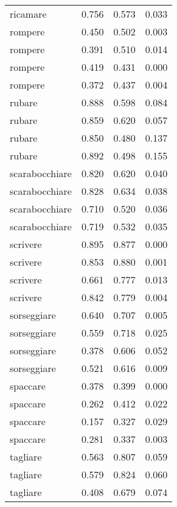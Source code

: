 \begin{longtable}{l|rrr}
ricamare       & 0.756  & 0.573     & 0.033         \\
rompere        & 0.450   & 0.502     & 0.003         \\
rompere        & 0.391  & 0.510      & 0.014         \\
rompere        & 0.419  & 0.431     & 0.000             \\
rompere        & 0.372  & 0.437     & 0.004         \\
rubare         & 0.888  & 0.598     & 0.084         \\
rubare         & 0.859  & 0.620      & 0.057         \\
rubare         & 0.850   & 0.480      & 0.137         \\
rubare         & 0.892  & 0.498     & 0.155         \\
scarabocchiare & 0.820   & 0.620      & 0.040          \\
scarabocchiare & 0.828  & 0.634     & 0.038         \\
scarabocchiare & 0.710   & 0.520      & 0.036         \\
scarabocchiare & 0.719  & 0.532     & 0.035         \\
scrivere       & 0.895  & 0.877     & 0.000             \\
scrivere       & 0.853  & 0.880      & 0.001         \\
scrivere       & 0.661  & 0.777     & 0.013         \\
scrivere       & 0.842  & 0.779     & 0.004         \\
sorseggiare    & 0.640   & 0.707     & 0.005         \\
sorseggiare    & 0.559  & 0.718     & 0.025         \\
sorseggiare    & 0.378  & 0.606     & 0.052         \\
sorseggiare    & 0.521  & 0.616     & 0.009         \\
spaccare       & 0.378  & 0.399     & 0.000             \\
spaccare       & 0.262  & 0.412     & 0.022         \\
spaccare       & 0.157  & 0.327     & 0.029         \\
spaccare       & 0.281  & 0.337     & 0.003         \\
tagliare       & 0.563  & 0.807     & 0.059         \\
tagliare       & 0.579  & 0.824     & 0.060          \\
tagliare       & 0.408  & 0.679     & 0.074         \\

\end{longtable}
